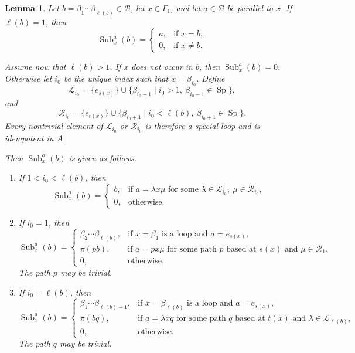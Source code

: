 \documentclass[11pt,a4paper,reqno]{amsart}
\newcommand{\mB}{\mathcal B}
\newcommand{\mL}{\mathcal L}
\newcommand{\mR}{\mathcal R}
\newcommand{\Sub}{\operatorname{Sub}}
\newcommand{\Sp}{\operatorname{Sp}}
\newcommand{\bet}{\beta_{\ell(b)}}
\theoremstyle{plain}
\newtheorem{lemma}[lemma]{Lemma}
\theoremstyle{definition}
\numberwithin{equation}{section}
\begin{document}
	\begin{lemma}\label{lem:replacement-criterion}
		Let $b=\beta_1\cdots\bet\in\mB$, let $x\in\Gamma_1$, and let
		$a\in\mB$ be parallel to $x$.  If $\ell(b)=1$, then
		\[
		\Sub_x^a(b)=
		\begin{cases}
			a, & \text{if } x=b,\\
			0, & \text{if } x\neq b.
		\end{cases}
		\]
		
		Assume now that $\ell(b)>1$.  If $x$ does not occur in $b$, then
		$\Sub_x^a(b)=0$.  Otherwise let $i_0$ be the unique index such that
		$x=\beta_{i_0}$.  Define
		\[
		\mL_{i_0}=
		\{e_{s(x)}\}
		\cup
		\{\beta_{i_0-1} \mid i_0>1,\ \beta_{i_0-1}\in\Sp\},
		\]
		and
		\[
		\mR_{i_0}=
		\{e_{t(x)}\}
		\cup
		\{\beta_{i_0+1} \mid i_0<\ell(b),\ \beta_{i_0+1}\in\Sp\}.
		\]
		Every nontrivial element of $\mL_{i_0}$ or $\mR_{i_0}$ is therefore a
		special loop and is idempotent in $A$.
		
		Then $\Sub_x^a(b)$ is given as follows.
		
		\begin{enumerate}
			\item If $1<i_0<\ell(b)$, then
			\[
			\Sub_x^a(b)=
			\begin{cases}
				b, & \text{if } a=\lambda x\mu\text{ for some }
				\lambda\in\mL_{i_0},\ \mu\in\mR_{i_0},\\
				0, & \text{otherwise.}
			\end{cases}
			\]
			
			\item If $i_0=1$, then
			\[
			\Sub_x^a(b)=
			\begin{cases}
				\beta_2\cdots\bet,
				& \text{if } x=\beta_1\text{ is a loop and }a=e_{s(x)},\\
				\pi(pb),
				& \text{if } a=px\mu\text{ for some path }p
				\text{ based at }s(x)\text{ and }\mu\in\mR_1,\\
				0, & \text{otherwise.}
			\end{cases}
			\]
			The path $p$ may be trivial.
			
			\item If $i_0=\ell(b)$, then
			\[
			\Sub_x^a(b)=
			\begin{cases}
				\beta_1\cdots\beta_{\ell(b)-1},
				& \text{if } x=\bet\text{ is a loop and }a=e_{s(x)},\\
				\pi(bq),
				& \text{if } a=\lambda xq\text{ for some path }q
				\text{ based at }t(x)\text{ and }\lambda\in\mL_{\ell(b)},\\
				0, & \text{otherwise.}
			\end{cases}
			\]
			The path $q$ may be trivial.
		\end{enumerate}
	\end{lemma}
	
\end{document}
